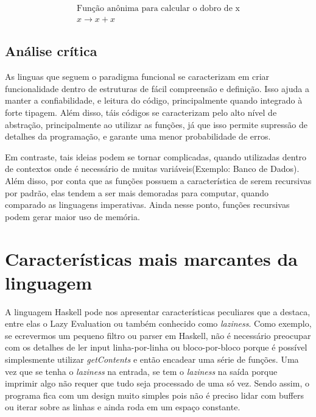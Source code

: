 \documentclass[
  12pt,				         %
  oneside,			       %
  a4paper,			       %
  english,		       	 %
  brazil,			      	 %
]{abntex2}
\begin{document}
    \begin{gather*}
      \text{Função anônima para calcular o dobro de x} \\ x \rightarrow x + x 
    \end{gather*}

    \section{Análise crítica} 

    As linguas que seguem o paradigma funcional se caracterizam em criar 
    funcionalidade dentro de estruturas de fácil compreensão e definição. Isso ajuda a manter 
    a confiabilidade, e leitura do código, principalmente quando integrado à forte tipagem. Além disso,
    táis códigos se caracterizam pelo alto nível de abstração, principalmente ao utilizar as funções,
    já que isso permite supressão de detalhes da programação, e garante uma menor probabilidade 
    de erros.

    Em contraste, tais ideias podem se tornar complicadas, quando utilizadas dentro de contextos
    onde é necessário de muitas variáveis(Exemplo: Banco de Dados). Além disso, por conta que as funções 
    possuem a característica de serem recursivas por padrão, elas tendem a ser mais demoradas para computar, 
    quando comparado as linguagens imperativas. Ainda nesse ponto, funções recursivas podem gerar maior uso de memória.


    \nocite{haskellslides}
    \nocite{funcoespura}
    \nocite{funcoespura2}
    \nocite{haskellwikipedia}
    \nocite{abntex2-wiki-como-customizar}


    \newpage

    \chapter{Características mais marcantes da linguagem}

    A linguagem Haskell pode nos apresentar características peculiares que a destaca, entre elas o Lazy Evaluation ou também conhecido como \emph{laziness}. Como exemplo,
    se ecrevermos um pequeno filtro ou parser em Haskell, não é necessário preocupar com os detalhes de ler input linha-por-linha ou bloco-por-bloco porque é possível
    simplesmente utilizar \emph{getContents} e então encadear uma série de funções. Uma vez que se tenha o \emph{laziness} na entrada, se tem o \emph{laziness} na saída porque imprimir
    algo não requer que tudo seja processado de uma só vez. Sendo assim, o programa fica com um design muito simples pois não é preciso lidar com buffers ou iterar sobre
    as linhas e ainda roda em um espaço constante.
\end{document}
